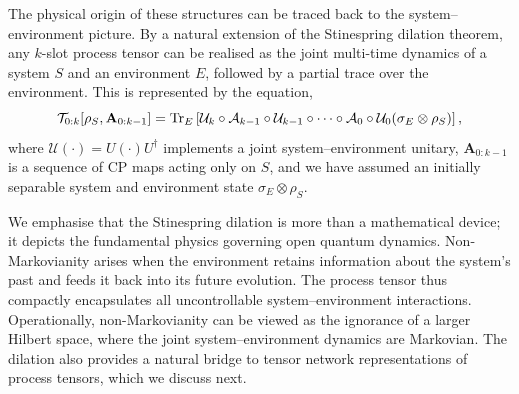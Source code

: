 The physical origin of these structures can be traced back to the system--environment picture. By a natural extension of the Stinespring dilation theorem, any \(k\)-slot process tensor can be realised as the joint multi-time dynamics of a system \(S\) and an environment \(E\), followed by a partial trace over the environment. This is represented by the equation,
\begin{equation}
    \mathcal{T}_{0:k}[\rho_S, \mathbf{A}_{0:k-1}] = \mathrm{Tr}_E\left[\mathcal{U}_k \circ \mathcal{A}_{k-1} \circ \mathcal{U}_{k-1} \circ \dots \circ \mathcal{A}_0 \circ \mathcal{U}_0(\sigma_E\otimes\rho_S) \right],
\end{equation}
where \(\mathcal{U}(\cdot) = U(\cdot)U^\dagger\) implements a joint system--environment unitary, \(\mathbf{A}_{0:k-1}\) is a sequence of CP maps acting only on \(S\), and we have assumed an initially separable system and environment state \(\sigma_E \otimes \rho_S\).

We emphasise that the Stinespring dilation is more than a mathematical device; it depicts the fundamental physics governing open quantum dynamics. Non-Markovianity arises when the environment retains information about the system’s past and feeds it back into its future evolution. The process tensor thus compactly encapsulates all uncontrollable system--environment interactions. Operationally, non-Markovianity can be viewed as the ignorance of a larger Hilbert space, where the joint system--environment dynamics are Markovian. The dilation also provides a natural bridge to tensor network representations of process tensors, which we discuss next.